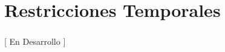 \documentclass[ 10pt, xcolor = dvipsnames]{beamer}
\begin{document}
\section{Restricciones Temporales}

\begin{frame}[allowframebreaks]
\frametitle{\insertsection}

\begin{center}
[ En Desarrollo ]
\end{center}

\end{frame}
\end{document}

